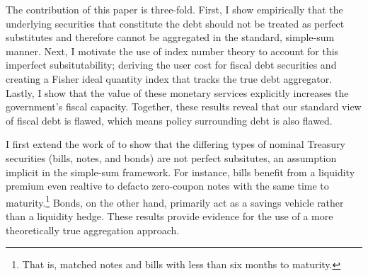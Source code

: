 \documentclass[11pt,a4paper,margin=1.5in]{article}
\begin{document}
The contribution of this paper is three-fold.
First, I show empirically that the underlying securities that constitute the debt should not be treated as perfect substitutes and therefore cannot be aggregated in the standard, simple-sum manner. 
Next, I motivate the use of index number theory to account for this imperfect subsitutability; deriving the user cost for fiscal debt securities and creating a Fisher ideal quantity index that tracks the true debt aggregator.
Lastly, I show that the value of these monetary services explicitly increases the government's fiscal capacity.
Together, these results reveal that our standard view of fiscal debt is flawed, which means policy surrounding debt is also flawed.

I first extend the work of \citet{Amihud-Mendelson:1991} to show that the differing types of nominal Treasury securities (bills, notes, and bonds) are not perfect subsitutes, an assumption implicit in the simple-sum framework. 
For instance, bills benefit from a liquidity premium even realtive to defacto zero-coupon notes with the same time to maturity.\footnote{
	That is, matched notes and bills with less than six months to maturity.
}
Bonds, on the other hand, primarily act as a savings vehicle rather than a liquidity hedge. 
These results provide evidence for the use of a more theoretically true aggregation approach.
\end{document}
